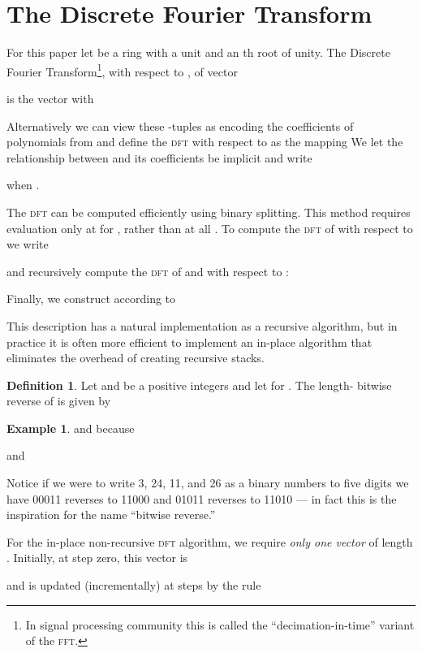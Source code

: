 \documentclass[12pt]{article}
\theoremstyle{definition}
\newcommand{\0}{\mathbf{0}}
\theoremstyle{theorem}
\theoremstyle{definition}
\newtheorem*{definition}{Definition}
\newtheorem*{example}{Example}
\begin{document}
\section{The Discrete Fourier Transform}\label{Section::DFT}
For this paper let  be a ring with  a unit and  an th root of unity. The Discrete Fourier Transform\footnote{In signal processing community this is called the ``decimation-in-time'' variant of the \textsc{fft}.}, with respect to , of vector 

is the vector  with 

Alternatively we can view these -tuples as encoding the coefficients of polynomials from  and define the \textsc{dft} with respect to  as the mapping 
We let the relationship between  and its coefficients be implicit and write 

when .

The \textsc{dft} can be computed efficiently using binary splitting. This method requires evaluation only at  for , rather than at all . To compute the \textsc{dft} of  with respect to  we write

and recursively compute the \textsc{dft} of  and  with respect to :

Finally, we construct  according to



This description has a natural implementation as a recursive algorithm, but in practice it is often more efficient to implement an in-place algorithm that eliminates the overhead of creating recursive stacks.

\begin{definition}
Let  and  be a positive integers and let  for . The length- bitwise reverse of  is given by

\end{definition}


\begin{example}  and  because

and
 
Notice if we were to write 3, 24, 11, and 26 as a binary numbers to five digits we have 00011 reverses to 11000 and 01011 reverses to 11010 --- in fact this is the inspiration for the name ``bitwise reverse.''
\end{example}

For the in-place non-recursive \textsc{dft} algorithm, we require \emph{only one vector} of length . Initially, at step zero, this vector is

and is updated (incrementally) at steps  by the rule
\end{document}
